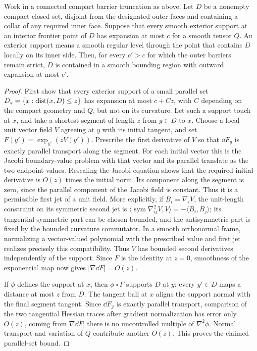 \begin{lemma}\label{d:weak-support}
Work in a connected compact barrier truncation as above.  Let $D$ be
a nonempty compact closed set, disjoint from the designated outer
faces and containing a collar of any required inner face.  Suppose
that every smooth exterior support at an interior frontier point of
$D$ has expansion at most $c$ for a smooth tensor $Q$.  An exterior
support means a smooth regular level through the point that contains
$D$ locally on its inner side.  Then, for every $c'>c$ for which the
outer barriers remain strict, $D$ is contained in a smooth bounding
region with outward expansion at most $c'$.
\end{lemma}
\begin{proof}
First show that every exterior support of a small parallel set
$D_z=\{x:\operatorname{dist}(x,D)\le z\}$ has expansion at most $c+Cz$, with $C$
depending on the compact geometry and $Q$, but not on its curvature.
Let such a support touch at $x$, and take a shortest segment of length
$z$ from $y\in D$ to $x$.  Choose a local unit vector field $V$ agreeing
at $y$ with its initial tangent, and set $F(y')=\exp_{y'}(zV(y'))$.
Prescribe the first derivative of $V$ so that $\dd F_y$ is exactly
parallel transport along the segment.  For each initial vector this
is the Jacobi boundary-value problem with that vector and its parallel
translate as the two endpoint values.  Rescaling the Jacobi equation
shows that the required initial derivative is $O(z)$ times the
initial norm.  Its component along the segment is zero, since the
parallel component of the Jacobi field is constant.  Thus it is a
permissible first jet of a unit field.  More explicitly, if
$B_i=\nabla_iV$, the unit-length constraint on its symmetric second
jet is
$\langle\operatorname{sym}\nabla^2_{ij}V,V\rangle
=-\langle B_i,B_j\rangle$; its tangential symmetric part can be
chosen bounded, and the antisymmetric part is fixed by the bounded
curvature commutator.  In a smooth orthonormal frame, normalizing a
vector-valued polynomial with the prescribed value and first jet
realizes precisely this compatibility.  Thus $V$ has bounded second
derivatives independently of the support.  Since $F$ is the identity
at $z=0$, smoothness of the exponential map now gives
$|\nabla\dd F|=O(z)$.

If $\phi$ defines the support at $x$, then $\phi\circ F$ supports $D$
at $y$: every $y'\in D$ maps a distance at most $z$ from $D$.  The
tangent ball at $x$ aligns the support normal with the final segment
tangent.  Since $\dd F_y$ is exactly parallel transport, comparison
of the two tangential Hessian traces after gradient normalization
has error only $O(z)$, coming from $\nabla\dd F$; there is no
uncontrolled multiple of $\nabla^2\phi$.  Normal transport and
variation of $Q$ contribute another $O(z)$.  This proves the claimed
parallel-set bound.


\end{proof}
